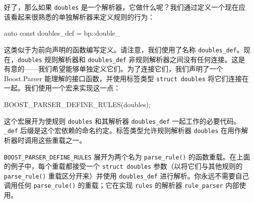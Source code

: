 好了，那么如果 \texttt{doubles} 是一个解析器，它做什么呢？我们通过定义一个现在应该看起来很熟悉的单独解析器来定义规则的行为：

\begin{code}
auto const doubles_def = bp::double_ %
\end{code}

这类似于为前向声明的函数编写定义。请注意，我们使用了名称 \texttt{doubles\_def}。现在，\texttt{doubles} 规则解析器和 \texttt{doubles\_def} 非规则解析器之间没有任何连接。这是有意的——我们希望能够单独定义它们。为了连接它们，我们声明了一个 Boost.Parser 能理解的接口函数，并使用标签类型 \texttt{struct doubles} 将它们连接在一起。我们使用一个宏来实现这一点：

\begin{code}
BOOST_PARSER_DEFINE_RULES(doubles);
\end{code}

这个宏展开为使规则 \texttt{doubles} 和其解析器 \texttt{doubles\_def} 一起工作的必要代码。 \texttt{\_def} 后缀是这个宏依赖的命名约定。标签类型允许规则解析器 \texttt{doubles} 在用作解析器时调用这些重载之一。

\texttt{BOOST\_PARSER\_DEFINE\_RULES} 展开为两个名为 \texttt{parse\_rule()} 的函数重载。在上面的例子中，每个重载都接受一个 \texttt{struct doubles} 参数（以将它们与其他规则的 \texttt{parse\_rule()} 重载区分开来）并使用 \texttt{doubles\_def} 进行解析。你永远不需要自己调用任何 \texttt{parse\_rule()} 的重载；它在实现 \texttt{rules} 的解析器 \texttt{rule\_parser} 内部使用。

